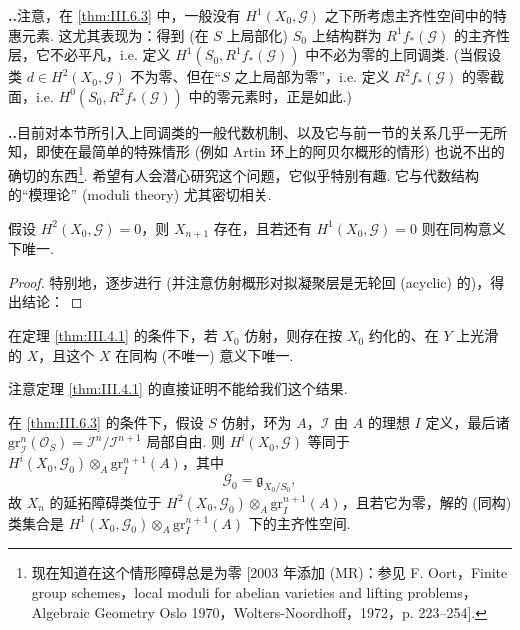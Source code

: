 \noindent\textbf{\thesection..}\quad 注意，在 \ref{thm:III.6.3} 中，一般没有 $H^1(X_0, \mathcal{G})$ 之下所考虑主齐性空间中的特惠元素. 这尤其表现为：得到 (在 $S$ 上局部化) $S_0$ 上结构群为 $R^1 f_{*}(\mathcal{G})$ 的主齐性层，它不必平凡，i.e. 定义 $H^1(S_0, R^1 f_{*}(\mathcal{G}))$ 中不必为零的上同调类. (当假设类 $d \in H^2(X_0, \mathcal{G})$ 不为零、但在``$S$ 之上局部为零''，i.e. 定义 $R^2 f_{*}(\mathcal{G})$ 的零截面，i.e. $H^0(S_0, R^2 f_{*}(\mathcal{G}))$ 中的零元素时，正是如此.)

\noindent\textbf{\thesection..}\quad 目前对本节所引入上同调类的一般代数机制、以及它与前一节的关系几乎一无所知，即使在最简单的特殊情形 (例如 Artin 环上的阿贝尔概形的情形) 也说不出的确切的东西\footnote{现在知道在这个情形障碍总是为零 [2003 年添加 (MR)：参见 F. Oort，Finite group schemes，local moduli for abelian varieties and lifting problems，Algebraic Geometry Oslo 1970，Wolters-Noordhoff，1972，p. 223--254].}. 希望有人会潜心研究这个问题，它似乎特别有趣. 它与代数结构的``模理论'' (moduli theory) 尤其密切相关.

\begin{corollary}\label{cor:III.6.7}
假设 $H^2(X_0, \mathcal{G}) = 0$，则 $X_{n+1}$ 存在，且若还有 $H^1(X_0, \mathcal{G}) = 0$ 则在同构意义下唯一.
\end{corollary}

\begin{proof}
特别地，逐步进行 (并注意仿射概形对拟凝聚层是无轮回 (acyclic) 的)，得出结论：
\end{proof}

\begin{corollary}\label{cor:III.6.8}
在定理 \ref{thm:III.4.1} 的条件下，若 $X_0$ 仿射，则存在按 $X_0$ 约化的、在 $Y$ 上光滑的 $X$，且这个 $X$ 在同构 (不唯一) 意义下唯一.
\end{corollary}

注意定理 \ref{thm:III.4.1} 的直接证明不能给我们这个结果.

\begin{corollary}\label{cor:III.6.9}
在 \ref{thm:III.6.3} 的条件下，假设 $S$ 仿射，环为 $A$，$\mathcal{I}$ 由 $A$ 的理想 $I$ 定义，最后诸 $\mathrm{gr}_{\mathcal{I}}^{n}(\mathcal{O}_S) = \mathcal{I}^n/\mathcal{I}^{n+1}$ 局部自由. 则 $H^i(X_0, \mathcal{G})$ 等同于 $H^i(X_0, \mathcal{G}_0) \otimes_A \mathrm{gr}_{I}^{n+1}(A)$，其中
\[
\mathcal{G}_0 = \mathfrak{g}_{X_0/S_0},
\]
故 $X_n$ 的延拓障碍类位于 $H^2(X_0, \mathcal{G}_0) \otimes_A \mathrm{gr}_{I}^{n+1}(A)$，且若它为零，解的 (同构) 类集合是 $H^1(X_0, \mathcal{G}_0) \otimes_A \mathrm{gr}_{I}^{n+1}(A)$ 下的主齐性空间.
\end{corollary}


